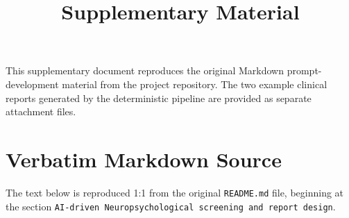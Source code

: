 \documentclass[11pt]{article}
\title{Supplementary Material}
\author{}
\date{}
\begin{document}
\maketitle

\noindent This supplementary document reproduces the original Markdown prompt-development material from the project repository. The two example clinical reports generated by the deterministic pipeline are provided as separate attachment files.

\section*{Verbatim Markdown Source}

\noindent The text below is reproduced 1:1 from the original \texttt{README.md} file, beginning at the section \texttt{AI-driven Neuropsychological screening and report design}.

\bigskip

\end{document}
